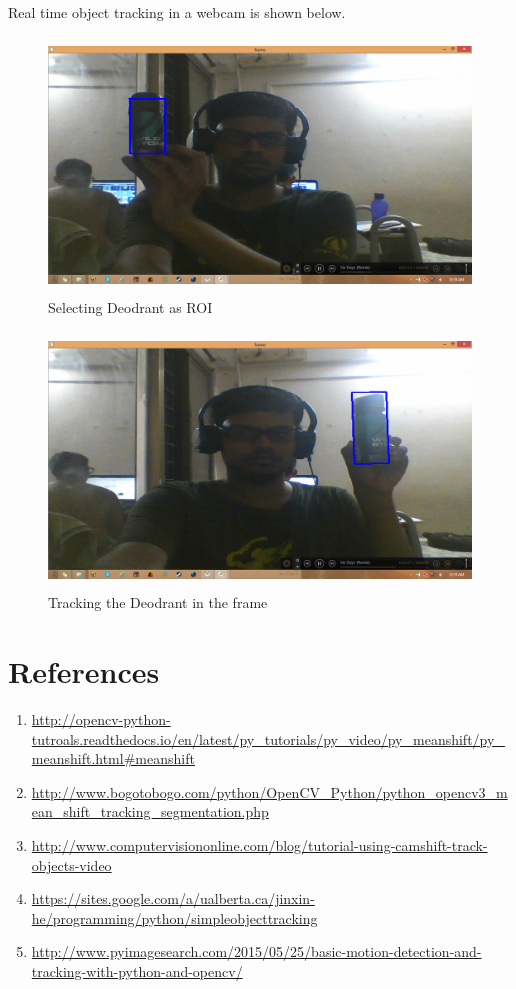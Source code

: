 \documentclass[11pt,a4paper]{article}
\begin{document}
  \newpage
 Real time object tracking in a webcam is shown below.  
	 \begin{figure}[h]
 \includegraphics[width=0.9\linewidth, height=6.8cm]{Cam_ROI.png}
   \centering
 \caption{Selecting Deodrant as ROI}
  \end{figure}
  \begin{figure}[h]
 \includegraphics[width=0.9\linewidth, height=6.8cm]{Cam_Det.png}
   \centering
 \caption{Tracking the Deodrant in the frame}
  \end{figure}
	
	\newpage
	\section{References}
		\begin{enumerate}
			\item \url{http://opencv-python-tutroals.readthedocs.io/en/latest/py_tutorials/py_video/py_meanshift/py_meanshift.html#meanshift}
			\item \url{http://www.bogotobogo.com/python/OpenCV_Python/python_opencv3_mean_shift_tracking_segmentation.php}
			\item \url{http://www.computervisiononline.com/blog/tutorial-using-camshift-track-objects-video}
			\item \url{https://sites.google.com/a/ualberta.ca/jinxin-he/programming/python/simpleobjecttracking}
			\item \url{http://www.pyimagesearch.com/2015/05/25/basic-motion-detection-and-tracking-with-python-and-opencv/}
		\end{enumerate}
			
\end{document}

